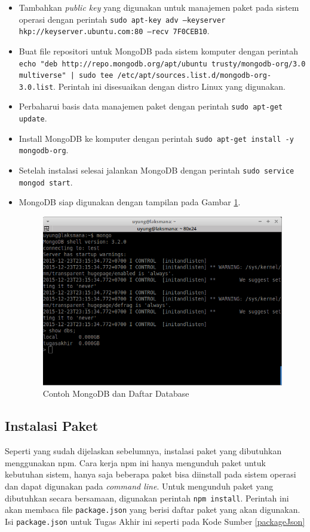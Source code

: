 \documentclass{ta-its}
\begin{document}
				\begin{itemize}
					\item Tambahkan \textit{public key} yang digunakan untuk manajemen paket pada sistem operasi dengan perintah \texttt{sudo apt-key adv --keyserver hkp://keyserver.ubuntu.com:80 --recv 7F0CEB10}.
					\item Buat file repositori untuk MongoDB pada sistem komputer dengan perintah \texttt{echo "deb http://repo.mongodb.org/apt/ubuntu trusty/mongodb-org/3.0 multiverse" | sudo tee /etc/apt/sources.list.d/mongodb-org-3.0.list}. Perintah ini disesuaikan dengan distro Linux yang digunakan.
					\item Perbaharui basis data manajemen paket dengan perintah \texttt{sudo apt-get update}.
					\item Install MongoDB ke komputer dengan perintah \texttt{sudo apt-get install -y mongodb-org}.
					\item Setelah instalasi selesai jalankan MongoDB dengan perintah \texttt{sudo service mongod start}.
					\item MongoDB siap digunakan dengan tampilan pada Gambar \ref{gambarCekMongoDB}.
					\begin{figure}[h] %
						\centering
						\includegraphics[width=\linewidth]{contoh_img/cekmongodb}
						\caption{Contoh MongoDB dan Daftar Database}
						\label{gambarCekMongoDB}
					\end{figure}
					
				\end{itemize}
				
				
			\subsection{Instalasi Paket}
			Seperti yang sudah dijelaskan sebelumnya, instalasi paket yang dibutuhkan menggunakan npm. Cara kerja npm ini hanya mengunduh paket untuk kebutuhan sistem, hanya saja beberapa paket bisa diinstall pada sistem operasi dan dapat digunakan pada \textit{command line}. 
			Untuk mengunduh paket yang dibutuhkan secara bersamaan, digunakan perintah \texttt{npm install}. Perintah ini akan membaca file \texttt{package.json} yang berisi daftar paket yang akan digunakan. Isi \texttt{package.json} untuk Tugas Akhir ini seperti pada Kode Sumber \ref{packageJson}
\end{document}
